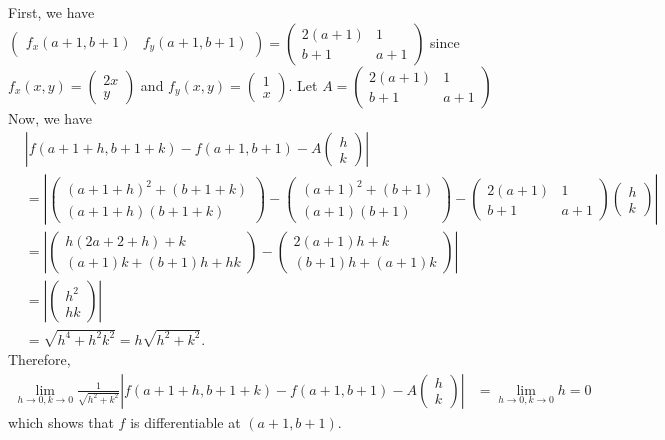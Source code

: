 \documentclass{article}
\begin{document}
First, we have $\begin{pmatrix}
    f_x(a+1,b+1) &f_y(a+1,b+1)
\end{pmatrix} = 
\begin{pmatrix}
    2(a+1) &1\\
    b+1 &a+1
\end{pmatrix}$ 
since $f_x(x,y) = \begin{pmatrix}
    2x\\ y
\end{pmatrix}$ and $f_y(x,y) = \begin{pmatrix}
    1\\ x
\end{pmatrix}$. Let $A = 
    \begin{pmatrix}
        2(a+1) &1\\
        b+1 &a+1
    \end{pmatrix}$
Now, we have 
\begin{align*}
&\left|f(a+1+h,b+1+k) - f(a+1,b+1)
- A\begin{pmatrix}
    h\\ k
\end{pmatrix}\right|\\
&=
\left|
\begin{pmatrix}
    (a+1+h)^2+(b+1+k)\\
    (a+1+h)(b+1+k)
\end{pmatrix}
-
\begin{pmatrix}
    (a+1)^2+(b+1)\\
    (a+1)(b+1)
\end{pmatrix}
-
\begin{pmatrix}
    2(a+1) &1\\
    b+1 &a+1
\end{pmatrix}
\begin{pmatrix}
    h\\ k
\end{pmatrix}
\right|\\
&=
\left|
\begin{pmatrix}
    h(2a+2+h)+k\\
    (a+1)k+(b+1)h+hk
\end{pmatrix}
-
\begin{pmatrix}
    2(a+1)h+k\\
    (b+1)h + (a+1)k
\end{pmatrix}
\right|\\
&=
\left|
\begin{pmatrix}
    h^2\\
    hk
\end{pmatrix}
\right|\\
&=\sqrt{h^4+h^2k^2}=h\sqrt{h^2+k^2}.
\end{align*}
Therefore,
\begin{align*}
    \lim_{h \to 0,k \to 0}\frac{1}{\sqrt{h^2+k^2}}\left|f(a+1+h,b+1+k) - f(a+1,b+1)
    - A\begin{pmatrix}
        h\\ k
    \end{pmatrix}\right|
    &=\lim_{h \to 0,k \to 0}h=0
\end{align*}
which shows that $f$ is differentiable at $(a+1,b+1)$.
\end{document}
